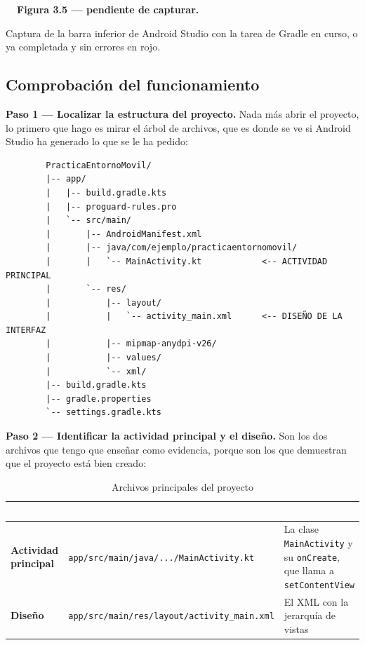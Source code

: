 \documentclass[11pt,a4paper]{article}
\newcommand{\code}[1]{\texttt{\color{primary}#1}}
\newcommand{\archivo}[1]{\texttt{\color{accent!85!black}#1}}
\newcommand{\campo}[1]{\textbf{\color{primary}#1}}
\newcommand{\figpend}[2]{%
	\begin{capturabox}
		\textbf{\color{accent2!70!black}\faCamera\ \ Figura #1 --- pendiente de capturar.}%
		\par\smallskip #2
	\end{capturabox}%
}
\begin{document}
	\figpend{3.5}{Captura de la barra inferior de Android Studio con la tarea de Gradle en curso, o ya completada y sin errores en rojo.}
	
	\subsection{Comprobación del funcionamiento}
	
	\campo{Paso 1 --- Localizar la estructura del proyecto.}
	Nada más abrir el proyecto, lo primero que hago es mirar el árbol de archivos, que es donde se ve si Android Studio ha generado lo que se le ha pedido:
	
	\begin{verbatim}
		PracticaEntornoMovil/
		|-- app/
		|   |-- build.gradle.kts
		|   |-- proguard-rules.pro
		|   `-- src/main/
		|       |-- AndroidManifest.xml
		|       |-- java/com/ejemplo/practicaentornomovil/
		|       |   `-- MainActivity.kt            <-- ACTIVIDAD PRINCIPAL
		|       `-- res/
		|           |-- layout/
		|           |   `-- activity_main.xml      <-- DISEÑO DE LA INTERFAZ
		|           |-- mipmap-anydpi-v26/
		|           |-- values/
		|           `-- xml/
		|-- build.gradle.kts
		|-- gradle.properties
		`-- settings.gradle.kts
	\end{verbatim}
	
	\campo{Paso 2 --- Identificar la actividad principal y el diseño.}
	Son los dos archivos que tengo que enseñar como evidencia, porque son los que demuestran que el proyecto está bien creado:
	
	\begin{table}[htbp]
		\centering
		\small
		\begin{tabularx}{\textwidth}{@{}>{\RaggedRight\arraybackslash}p{3.5cm} >{\RaggedRight\arraybackslash}p{5.5cm} >{\RaggedRight\arraybackslash}X@{}}
			\toprule
			\rowcolor{primary}
			\textcolor{white}{\sffamily\bfseries Archivo} & \textcolor{white}{\sffamily\bfseries Ruta} & \textcolor{white}{\sffamily\bfseries Qué contiene} \\
			\midrule
			\textbf{Actividad principal} & \archivo{app/src/main/java/.../MainActivity.kt} & La clase \code{MainActivity} y su \code{onCreate}, que llama a \code{setContentView} \\
			\rowcolor{soft}
			\textbf{Diseño} & \archivo{app/src/main/res/layout/activity\_main.xml} & El XML con la jerarquía de vistas \\
			\bottomrule
		\end{tabularx}
		\caption{Archivos principales del proyecto}
	\end{table}
	
\end{document}
